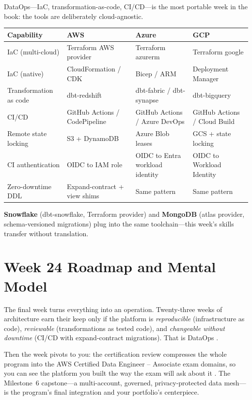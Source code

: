 \begin{crosscloud}
DataOps---IaC, transformation-as-code, CI/CD---is the most portable week in the book: the tools are deliberately cloud-agnostic.

\vspace{2mm}
{\footnotesize
\begin{tabular}{@{}p{2.8cm}p{3.0cm}p{3.0cm}p{3.0cm}@{}}
\toprule
\textbf{Capability} & \textbf{AWS} & \textbf{Azure} & \textbf{GCP} \\
\midrule
IaC (multi-cloud) & Terraform AWS provider & Terraform azurerm & Terraform google \\
IaC (native) & CloudFormation / CDK & Bicep / ARM & Deployment Manager \\
Transformation as code & dbt-redshift & dbt-fabric / dbt-synapse & dbt-bigquery \\
CI/CD & GitHub Actions / CodePipeline & GitHub Actions / Azure DevOps & GitHub Actions / Cloud Build \\
Remote state locking & S3 + DynamoDB & Azure Blob leases & GCS + state locking \\
\addlinespace
CI authentication & OIDC to IAM role & OIDC to Entra workload identity & OIDC to Workload Identity \\
Zero-downtime DDL & Expand-contract + view shims & Same pattern & Same pattern \\
\bottomrule
\end{tabular}}

\vspace{1mm}
\textbf{Snowflake} (dbt-snowflake, Terraform provider) and \textbf{MongoDB} (atlas provider, schema-versioned migrations) plug into the same toolchain---this week's skills transfer without translation.
\end{crosscloud}

\section{Week 24 Roadmap and Mental Model}
The final week turns everything into an operation. Twenty-three weeks of architecture earn their keep only if the platform is \emph{reproducible} (infrastructure as code), \emph{reviewable} (transformations as tested code), and \emph{changeable without downtime} (CI/CD with expand-contract migrations). That is DataOps \cite{terraformAWSProvider,dbtCore,githubActionsDocs}.

Then the week pivots to you: the certification review compresses the whole program into the AWS Certified Data Engineer -- Associate exam domains, so you can see the platform you built the way the exam will ask about it \cite{awsCertDataEngineer}. The Milestone~6 capstone---a multi-account, governed, privacy-protected data mesh---is the program's final integration and your portfolio's centerpiece.

